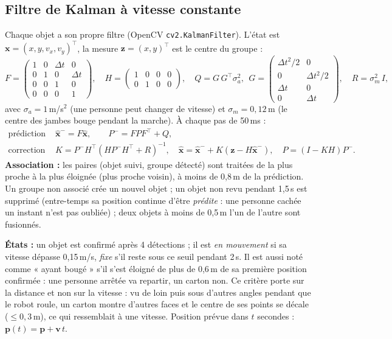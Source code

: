 \documentclass[11pt,a4paper]{article}
\newcommand{\code}[1]{\texttt{#1}}
\begin{document}
\subsection{Filtre de Kalman à vitesse constante}
Chaque objet a son propre filtre (OpenCV \code{cv2.KalmanFilter}). L'état est
$\mathbf{x} = (x, y, v_x, v_y)^\top$, la mesure $\mathbf{z} = (x, y)^\top$ est le centre du groupe :
\begin{equation}
F = \begin{pmatrix} 1&0&\Delta t&0\\ 0&1&0&\Delta t\\ 0&0&1&0\\ 0&0&0&1 \end{pmatrix},\quad
H = \begin{pmatrix} 1&0&0&0\\ 0&1&0&0 \end{pmatrix},\quad
Q = G\,G^\top\sigma_a^2,\ \ G = \begin{pmatrix} \Delta t^2/2&0\\ 0&\Delta t^2/2\\ \Delta t&0\\ 0&\Delta t \end{pmatrix},\quad
R = \sigma_m^2\,I,
\end{equation}
avec $\sigma_a = 1$\,m/s$^2$ (une personne peut changer de vitesse) et $\sigma_m = 0{,}12$\,m (le
centre des jambes bouge pendant la marche). À chaque pas de 50\,ms :
\begin{align}
\text{prédiction : }& \hat{\mathbf{x}}^- = F\hat{\mathbf{x}},\qquad P^- = F P F^\top + Q,\\
\text{correction : }& K = P^- H^\top (H P^- H^\top + R)^{-1},\quad
  \hat{\mathbf{x}} = \hat{\mathbf{x}}^- + K(\mathbf{z} - H\hat{\mathbf{x}}^-),\quad P = (I - K H)P^-.
\end{align}
\textbf{Association :} les paires (objet suivi, groupe détecté) sont traitées de la plus proche à
la plus éloignée (plus proche voisin), à moins de 0,8\,m de la prédiction. Un groupe non associé
crée un nouvel objet ; un objet non revu pendant 1,5\,s est supprimé (entre-temps sa position
continue d'être \emph{prédite} : une personne cachée un instant n'est pas oubliée) ; deux objets à
moins de 0,5\,m l'un de l'autre sont fusionnés.

\textbf{États :} un objet est confirmé après 4 détections ; il est \emph{en mouvement} si sa vitesse
dépasse 0,15\,m/s, \emph{fixe} s'il reste sous ce seuil pendant 2\,s. Il est aussi noté comme
« ayant bougé » s'il s'est éloigné de plus de 0,6\,m de sa première position confirmée : une
personne arrêtée va repartir, un carton non. Ce critère porte sur la distance et non sur la
vitesse : vu de loin puis sous d'autres angles pendant que le robot roule, un carton montre
d'autres faces et le centre de ses points se décale ($\leq 0{,}3$\,m), ce qui ressemblait à une
vitesse. Position prévue dans $t$ secondes : $\mathbf{p}(t) = \mathbf{p} + \mathbf{v}\,t$.
\end{document}
